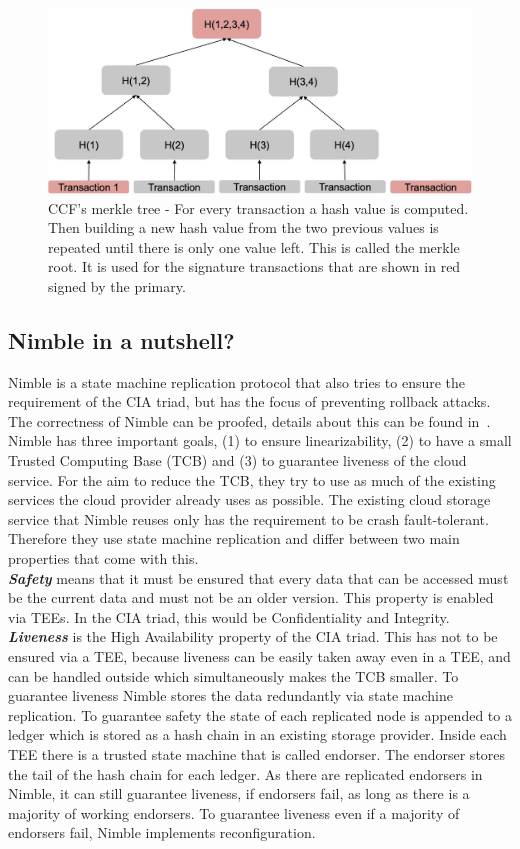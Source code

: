 \begin{figure}[t]
	\includegraphics[scale=0.18]{pictures/merkle_tree}
	\caption{CCF's merkle tree - For every transaction a hash value is computed. Then building a new hash value from the two previous values is repeated until there is only one value left. This is called the merkle root. It is used for the signature transactions that are shown in red signed by the primary.}
	\label{merkle}
\end{figure}



\subsection{Nimble in a nutshell?}
Nimble is a state machine replication protocol that also tries to ensure the requirement of the CIA triad, but has the focus of preventing rollback attacks. The correctness of Nimble can be proofed, details about this can be found in~\cite{Nimble}.\\
Nimble has three important goals, (1) to ensure linearizability, (2) to have a small Trusted Computing Base (TCB) and (3) to guarantee liveness of the cloud service. For the aim to reduce the TCB, they try to use as much of the existing services the cloud provider already uses as possible. The existing cloud storage service that Nimble reuses only has the requirement to be crash fault-tolerant. Therefore they use state machine replication and differ between two main properties that come with this.\\
	\textbf{\textit{Safety}} means that it must be ensured that every data that can be accessed must be the current data and must not be an older version. This property is enabled via TEEs. In the CIA triad, this would be Confidentiality and Integrity.\\
	\textbf{\textit{Liveness}} is the High Availability property of the CIA triad. This has not to be ensured via a TEE, because liveness can be easily taken away even in a TEE, and can be handled outside which simultaneously makes the TCB smaller.
	To guarantee liveness Nimble stores the data redundantly via state machine replication. To guarantee safety the state of each replicated node is appended to a ledger which is stored as a hash chain in an existing storage provider. Inside each TEE there is a trusted state machine that is called endorser. The endorser stores the tail of the hash chain for each ledger. As there are replicated endorsers in Nimble, it can still guarantee liveness, if endorsers fail, as long as there is a majority of working endorsers. To guarantee liveness even if a majority of endorsers fail, Nimble implements reconfiguration. 
